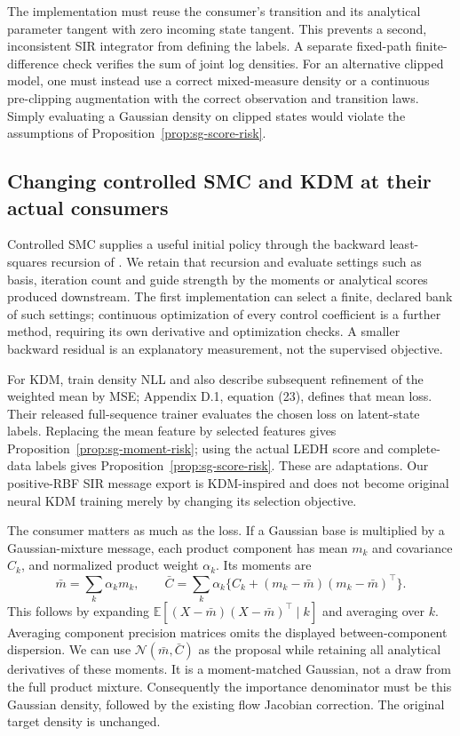 The implementation must reuse the consumer's transition and its analytical
parameter tangent with zero incoming state tangent. This prevents a second,
inconsistent SIR integrator from defining the labels. A separate fixed-path
finite-difference check verifies the sum of joint log densities. For an
alternative clipped model, one must instead use a correct mixed-measure
density or a continuous pre-clipping augmentation with the correct observation
and transition laws. Simply evaluating a Gaussian density on clipped states
would violate the assumptions of Proposition~\ref{prop:sg-score-risk}.

\subsection{Changing controlled SMC and KDM at their actual consumers}

Controlled SMC supplies a useful initial policy through the backward
least-squares recursion of \citet[Section 4.2, equations (20)--(21)]{heng2020controlled}.
We retain that recursion and evaluate settings such as basis, iteration count
and guide strength by the moments or analytical scores produced downstream.
The first implementation can select a finite, declared bank of such settings;
continuous optimization of every control coefficient is a further method,
requiring its own derivative and optimization checks. A smaller backward
residual is an explanatory measurement, not the supervised objective.

For KDM, \citet[Section 5, equation (18)]{younis2023} train density NLL and
also describe subsequent refinement of the weighted mean by MSE; Appendix
D.1, equation (23), defines that mean loss. Their released full-sequence
trainer evaluates the chosen loss on latent-state labels. Replacing the mean
feature by selected features gives Proposition~\ref{prop:sg-moment-risk};
using the actual LEDH score and complete-data labels gives
Proposition~\ref{prop:sg-score-risk}. These are adaptations. Our positive-RBF
SIR message export is KDM-inspired and does not become original neural KDM
training merely by changing its selection objective.

The consumer matters as much as the loss. If a Gaussian base is multiplied
by a Gaussian-mixture message, each product component has mean $m_k$ and
covariance $C_k$, and normalized product weight $\alpha_k$. Its moments are
\begin{equation}
 \bar m=\sum_k\alpha_km_k,\qquad
 \bar C=\sum_k\alpha_k\{C_k+(m_k-\bar m)(m_k-\bar m)^\top\}.
\label{eq:sg-product-moments}
\end{equation}
This follows by expanding
$\mathbb E[(X-\bar m)(X-\bar m)^\top\mid k]$ and averaging over $k$.
Averaging component precision matrices omits the displayed between-component
dispersion. We can use $\mathcal N(\bar m,\bar C)$ as the proposal while
retaining all analytical derivatives of these moments. It is a moment-matched
Gaussian, not a draw from the full product mixture. Consequently the
importance denominator must be this Gaussian density, followed by the
existing flow Jacobian correction. The original target density is unchanged.

